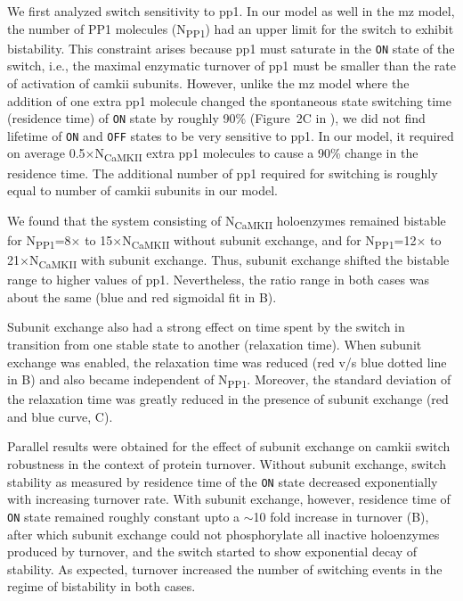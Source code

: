 \documentclass[9pt,lineno,doublespacing]{elife}
\newcommand\SUB[2]{#1\textsubscript{#2}}
\begin{document}
    
We first analyzed switch sensitivity to \gls{pp1}. In our model as well in the
\gls{mz} model, the number of PP1 molecules (\SUB{N}{PP1}) had an upper
limit for the switch to exhibit bistability. This constraint arises because
\gls{pp1} must saturate in the \texttt{ON} state of the switch, i.e., 
the maximal enzymatic turnover of \gls{pp1} must be smaller than the rate of activation 
of \gls{camkii} subunits.  However, unlike the \gls{mz} model where the 
addition of one extra \gls{pp1} molecule changed the spontaneous state 
switching time (residence time) of \texttt{ON} state by roughly 90\% (Figure~2C
in \citep{miller_stability_2005}), we did not find lifetime of \texttt{ON} and
\texttt{OFF} states to be very sensitive to \gls{pp1}. In our model, it required
on average 0.5$\times$\SUB{N}{CaMKII} extra \gls{pp1} molecules to cause a 90\% 
change in the residence time. The additional number of \gls{pp1} required for 
switching is roughly equal to number of \gls{camkii} subunits in our model.

We found that the system consisting of \SUB{N}{CaMKII} holoenzymes remained
bistable for \SUB{N}{PP1}=8$\times$ to 15$\times$\SUB{N}{CaMKII} without subunit
exchange, and for \SUB{N}{PP1}=12$\times$ to 21$\times$\SUB{N}{CaMKII} with
subunit exchange. Thus, subunit exchange shifted the bistable range to higher
values of \gls{pp1}. Nevertheless, the ratio range in both cases was about the
same (blue and red sigmoidal fit in B).

Subunit exchange also had a strong effect on time spent by the switch in
transition from one stable state to another (relaxation time). When subunit
exchange was enabled, the relaxation time was reduced (red v/s blue dotted line
in B) and also became independent of \SUB{N}{PP1}.
Moreover, the standard deviation of the relaxation time was greatly reduced in
the presence of subunit exchange (red and blue curve,
C).

Parallel results were obtained for the effect of subunit exchange on
\gls{camkii} switch robustness in the context of protein turnover. Without
subunit exchange, switch stability as measured by residence time of the \texttt{ON}
state decreased exponentially with increasing turnover rate. With
subunit exchange, however, residence time of \texttt{ON} state remained roughly
constant upto a $\sim$10 fold increase in turnover (B),
after which subunit exchange could not phosphorylate all inactive holoenzymes
produced by turnover, and the switch started to show exponential decay of 
stability. As expected, turnover increased the number of switching events 
in the regime of bistability in both cases.
\end{document}
